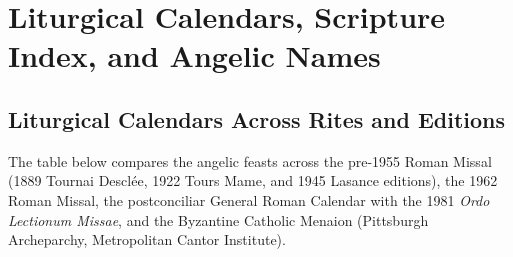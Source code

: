 \section{Liturgical Calendars, Scripture Index, and Angelic Names}
\label{app:calendar-scripture-names}

\subsection{Liturgical Calendars Across Rites and Editions}

The table below compares the angelic feasts across the pre-1955 Roman Missal (1889 Tournai Descl\'ee, 1922 Tours Mame, and 1945 Lasance editions), the 1962 Roman Missal, the postconciliar General Roman Calendar with the 1981 \emph{Ordo Lectionum Missae}, and the Byzantine Catholic Menaion (Pittsburgh Archeparchy, Metropolitan Cantor Institute).

